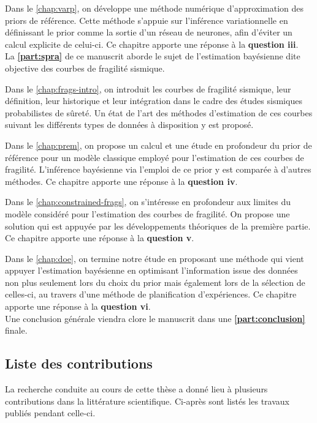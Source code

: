 \noindent
Dans le \cref{chap:varp}, on développe une méthode numérique d'approximation des priors de référence. Cette méthode s'appuie sur l'inférence variationnelle en définissant le prior comme la sortie d'un réseau de neurones, afin d'éviter un calcul explicite de celui-ci. Ce chapitre apporte une réponse à la \textbf{question iii}. \\


La \textbf{\cref{part:spra}} de ce manuscrit aborde le sujet de l'estimation bayésienne dite objective des courbes de fragilité sismique.

\noindent
Dans le \cref{chap:frags-intro}, on introduit les courbes de fragilité sismique, leur définition, leur historique et leur intégration dans le cadre des études sismiques probabilistes de sûreté. Un état de l'art des méthodes d'estima\-tion de ces courbes suivant les différents types de données à disposition y est proposé.

\noindent
Dans le \cref{chap:prem}, on propose un calcul et une étude en profondeur du prior de référence pour un modèle classique employé pour l'estimation de ces courbes de fragilité. L'inférence bayésienne via l'emploi de ce prior y est comparée à d'autres méthodes. Ce chapitre apporte une réponse à la \textbf{question iv}.

\noindent
Dans le \cref{chap:constrained-frags}, on s'intéresse en profondeur aux limites du modèle considéré pour l'estimation des courbes de fragilité. On propose une solution qui est appuyée par les développements théoriques de la première partie. Ce chapitre apporte une réponse à la \textbf{question v}.

\noindent
Dans le \cref{chap:doe}, on termine notre étude en proposant une méthode qui vient appuyer l'estimation bayésienne en optimisant l'information issue des données non plus seulement  lors du choix du prior mais également lors de la sélection de celles-ci, au travers d'une méthode de planification d'expériences. Ce chapitre apporte une réponse à la \textbf{question vi}.\\


Une conclusion générale viendra clore le manuscrit dans une \textbf{\cref{part:conclusion}} finale.


\subsection{Liste des contributions}

La recherche conduite au cours de cette thèse a donné lieu à plusieurs contributions dans la littérature scientifique. Ci-après sont listés les travaux publiés pendant celle-ci.


